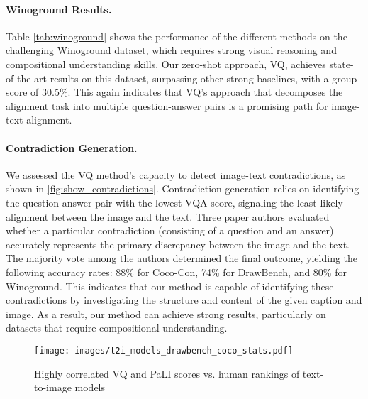 \documentclass{article}
\newcommand{\VQSQR}[0]{VQ\xspace}
\begin{document}
\paragraph{Winoground Results.} Table \ref{tab:winoground} shows the performance of the different methods on the challenging Winoground dataset, which requires strong visual reasoning and compositional understanding skills. Our zero-shot approach, \VQSQR, achieves state-of-the-art results on this dataset, surpassing other strong baselines, with a group score of 30.5\%. This again indicates that \VQSQR's approach that decomposes the alignment task into multiple question-answer pairs is a promising path for image-text alignment. 


\paragraph{Contradiction Generation.} We assessed the \VQSQR method's capacity to detect image-text contradictions, as shown in \cref{fig:show_contradictions}. Contradiction generation relies on identifying the question-answer pair with the lowest VQA score, signaling the least likely alignment between the image and the text. Three paper authors evaluated whether a particular contradiction (consisting of a question and an answer) accurately represents the primary discrepancy between the image and the text. The majority vote among the authors determined the final outcome, yielding the following accuracy rates: 88\% for Coco-Con, 74\% for DrawBench, and 80\% for Winoground. This indicates that our method is capable of identifying these contradictions by investigating the structure and content of the given caption and image. As a result, our method can achieve strong results, particularly on datasets that require compositional understanding.


\begin{figure}[!t]
    \centering
    \texttt{[image: images/t2i\_models\_drawbench\_coco\_stats.pdf]}\\
\caption{Highly correlated \VQSQR and PaLI scores vs. human rankings of text-to-image models}
\vspace{-20px}
    \label{fig:t2i_comparison}
\end{figure} 
\end{document}
